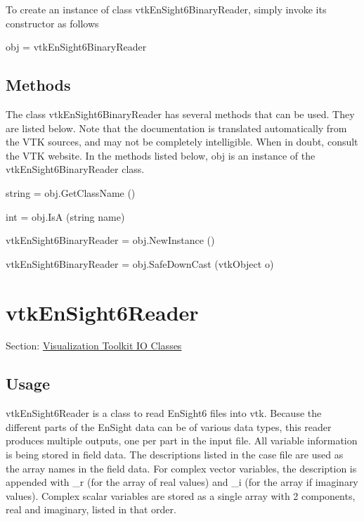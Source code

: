 To create an instance of class vtk\-En\-Sight6\-Binary\-Reader, simply invoke its constructor as follows \begin{DoxyVerb}  obj = vtkEnSight6BinaryReader
\end{DoxyVerb}
 \hypertarget{vtkwidgets_vtkxyplotwidget_Methods}{}\subsection{Methods}\label{vtkwidgets_vtkxyplotwidget_Methods}
The class vtk\-En\-Sight6\-Binary\-Reader has several methods that can be used. They are listed below. Note that the documentation is translated automatically from the V\-T\-K sources, and may not be completely intelligible. When in doubt, consult the V\-T\-K website. In the methods listed below, {\ttfamily obj} is an instance of the vtk\-En\-Sight6\-Binary\-Reader class. 
\begin{DoxyItemize}
\item {\ttfamily string = obj.\-Get\-Class\-Name ()}  
\item {\ttfamily int = obj.\-Is\-A (string name)}  
\item {\ttfamily vtk\-En\-Sight6\-Binary\-Reader = obj.\-New\-Instance ()}  
\item {\ttfamily vtk\-En\-Sight6\-Binary\-Reader = obj.\-Safe\-Down\-Cast (vtk\-Object o)}  
\end{DoxyItemize}\hypertarget{vtkio_vtkensight6reader}{}\section{vtk\-En\-Sight6\-Reader}\label{vtkio_vtkensight6reader}
Section\-: \hyperlink{sec_vtkio}{Visualization Toolkit I\-O Classes} \hypertarget{vtkwidgets_vtkxyplotwidget_Usage}{}\subsection{Usage}\label{vtkwidgets_vtkxyplotwidget_Usage}
vtk\-En\-Sight6\-Reader is a class to read En\-Sight6 files into vtk. Because the different parts of the En\-Sight data can be of various data types, this reader produces multiple outputs, one per part in the input file. All variable information is being stored in field data. The descriptions listed in the case file are used as the array names in the field data. For complex vector variables, the description is appended with \-\_\-r (for the array of real values) and \-\_\-i (for the array if imaginary values). Complex scalar variables are stored as a single array with 2 components, real and imaginary, listed in that order.

